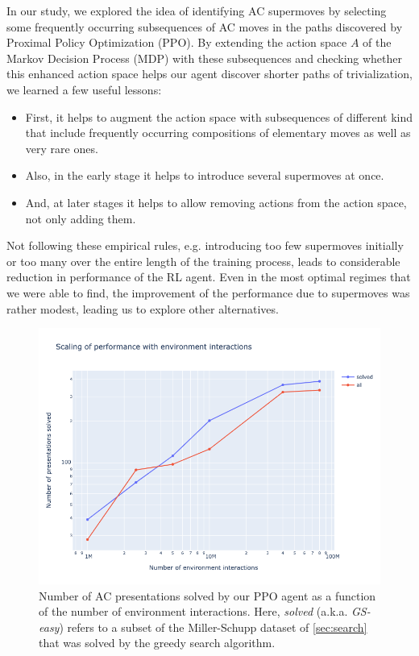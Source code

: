 In our study, we explored the idea of identifying AC supermoves by selecting some frequently occurring subsequences of AC moves in the paths discovered by Proximal Policy Optimization (PPO). By extending the action space $A$ of the Markov Decision Process (MDP) with these subsequences and checking whether this enhanced action space helps our agent discover shorter paths of trivialization, we learned a few useful lessons:

\begin{itemize}

\item First, it helps to augment the action space with subsequences of different kind that include frequently occurring compositions of elementary moves as well as very rare ones.

\item  Also, in the early stage it helps to introduce several supermoves at once.

\item And, at later stages it helps to allow removing actions from the action space, not only adding them.
    
\end{itemize}

\noindent
Not following these empirical rules, e.g. introducing too few supermoves initially or too many over the entire length of the training process, leads to considerable reduction in performance of the RL agent. Even in the most optimal regimes that we were able to find, the improvement of the performance due to supermoves was rather modest, leading us to explore other alternatives.

\begin{figure}
	\centering
	\includegraphics[scale=0.45]{fig/scaling_env.png}
	\caption{Number of AC presentations solved by our PPO agent as a function of the number of environment interactions. Here, \textit{solved} (a.k.a. \textit{GS-easy}) refers to a subset of the Miller-Schupp dataset of \autoref{sec:search} that was solved by the greedy search algorithm.}
	\label{fig:scaling_env}
\end{figure}

